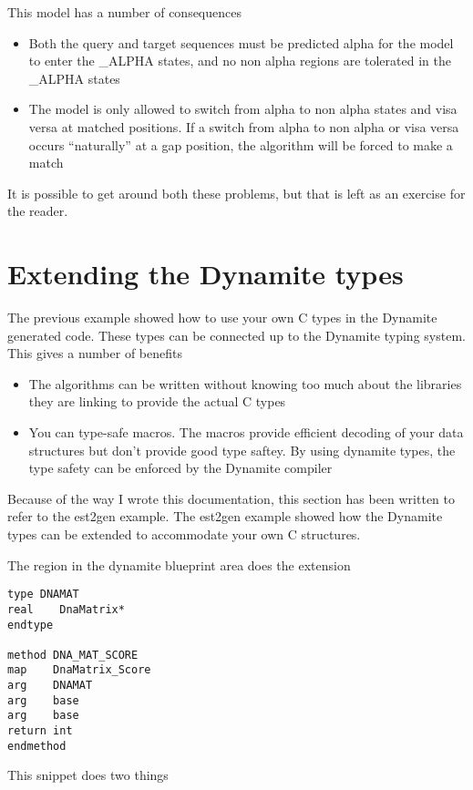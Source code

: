 This model has a number of consequences

\begin{itemize}
\item Both the query and target sequences must be predicted alpha for
the model to enter the \_ALPHA states, and no non alpha regions are
tolerated in the \_ALPHA states
\item The model is only allowed to switch from alpha to non alpha states
and visa versa at matched positions. If a switch from alpha to non alpha or
visa versa occurs ``naturally'' at a gap position, the algorithm will be forced
to make a match
\end{itemize}

It is possible to get around both these problems, but that is left as an exercise
for the reader.

\section{Extending the Dynamite types}

The previous example showed how to use your own C types in the 
Dynamite generated code. These types can be connected up to the
Dynamite typing system. This gives a number of benefits
\begin{itemize}
\item The algorithms can be written without knowing too much
about the libraries they are linking to provide the actual C types
\item You can type-safe macros. The macros provide efficient decoding
of your data structures but don't provide good type saftey. By using
dynamite types, the type safety can be enforced by the Dynamite compiler
\end{itemize}

Because of the way I wrote this documentation, this section has been
written to refer to the est2gen example. The est2gen example showed
how the Dynamite types can be extended to accommodate your own C
structures.

The region in the dynamite blueprint area does the extension

\begin{verbatim}
type DNAMAT
real    DnaMatrix*
endtype

method DNA_MAT_SCORE
map    DnaMatrix_Score
arg    DNAMAT
arg    base
arg    base
return int
endmethod
\end{verbatim}

This snippet does two things

